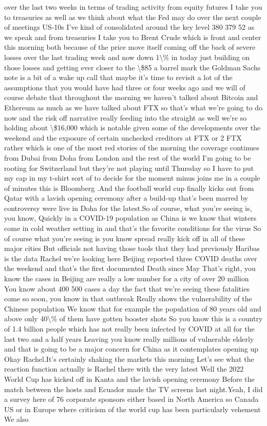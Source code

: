 \documentclass{article}%
\begin{document}
over the last two weeks in terms of trading activity from equity futures I take you to treasuries as well as we think about what the Fed may do over the next couple of meetings US{-}10s I've kind of consolidated around the key level 380 379 52 as we speak and from treasuries I take you to Brent Crude which is front and center this morning both because of the price move itself coming off the back of severe losses over the last trading week and now down 1\textbackslash{}\% in today just building on those losses and getting ever closer to the \textbackslash{}\$85 a barrel mark the Goldman Sachs note is a bit of a wake up call that maybe it's time to revisit a lot of the assumptions that you would have had three or four weeks ago and we will of course debate that throughout the morning we haven't talked about Bitcoin and Ethereum as much as we have talked about FTX so that's what we're going to do now and the risk off narrative really feeding into the straight as well we're so holding about \textbackslash{}\$16,000 which is notable given some of the developments over the weekend and the exposure of certain unchecked creditors at FTX or 2 FTX rather which is one of the most red stories of the morning the coverage continues from Dubai from Doha from London and the rest of the world I'm going to be rooting for Switzerland but they're not playing until Thursday so I have to put my cap in my t{-}shirt sort of to decide for the moment minus joins me in a couple of minutes this is Bloomberg .And the football world cup finally kicks out from Qatar with a lavish opening ceremony after a build{-}up that's been marred by controversy were live in Doha for the latest.So of course, what you're seeing is, you know,  Quickly in a COVID{-}19 population as China is we know that winters come in cold weather setting in and that's the favorite conditions for the virus So of course what you're seeing is you know spread really kick off in all of these major cities But officials not having those tools that they had previously Haribas is the data Rachel we're looking here Beijing reported three COVID deaths over the weekend and that's the first documented Death since May That's right, you know the cases in Beijing are really a low number for a city of over 20 million You know about 400 500 cases a day the fact that we're seeing these fatalities come so soon, you know in that outbreak Really shows the vulnerability of the Chinese population We know that for example the population of 80 years old and above only 40\textbackslash{}\% of them have gotten booster shots So you know this is a country of 1.4 billion people which has not really been infected by COVID at all for the last two and a half years Leaving you know really millions of vulnerable elderly and that is going to be a major concern for China as it contemplates opening up Okay Rachel.It's certainly shaking the markets this morning Let's see what the reaction function actually is Rachel there with the very latest Well the 2022 World Cup has kicked off in Kanta and the lavish opening ceremony Before the match between the hosts and Ecuador made the TV screens last night.Yeah, I did a survey here of 76 corporate sponsors either based in North America so Canada US or in Europe where criticism of the world cup has been particularly vehement We also 
\end{document}
